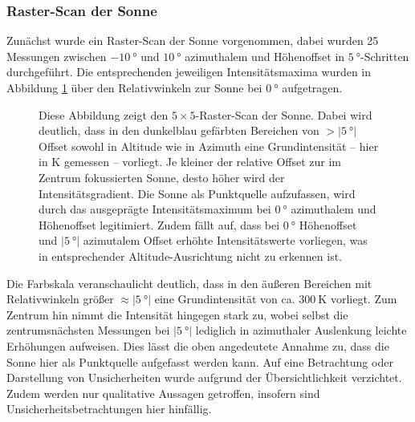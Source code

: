     \subsubsection{Raster-Scan der Sonne}
    Zunächst wurde ein Raster-Scan der Sonne vorgenommen, dabei wurden 25 Messungen zwischen $\SI{-10}{\degree}$ und $\SI{10}{\degree}$ azimuthalem und Höhenoffset in $\SI{5}{\degree}$-Schritten durchgeführt.
    Die entsprechenden jeweiligen Intensitätsmaxima wurden in Abbildung \ref{fig:Sonnenabbild} über den Relativwinkeln zur Sonne bei $\SI{0}{\degree}$ aufgetragen.
    \begin{figure}[H]
        \centering
        
        \caption[Raster-Scan der Sonne]{Diese Abbildung zeigt den $5 \times 5$-Raster-Scan der Sonne. Dabei wird deutlich, dass in den dunkelblau gefärbten Bereichen von $>\vert \SI{5}{\degree}\vert$ Offset sowohl in Altitude wie in Azimuth eine Grundintensität -- hier in \si{\kelvin} gemessen -- vorliegt. Je kleiner der relative Offset zur im Zentrum fokussierten Sonne, desto höher wird der Intensitätsgradient. Die Sonne als Punktquelle aufzufassen, wird durch das ausgeprägte Intensitätsmaximum bei $\SI{0}{\degree}$ azimuthalem und Höhenoffset legitimiert. Zudem fällt auf, dass bei $\SI{0}{\degree}$ Höhenoffset und $\vert\SI{5}{\degree}\vert$ azimutalem Offset erhöhte Intensitätswerte vorliegen, was in entsprechender Altitude-Ausrichtung nicht zu erkennen ist.}
        \label{fig:Sonnenabbild}
    \end{figure}
    Die Farbskala veranschaulicht deutlich, dass in den äußeren Bereichen mit Relativwinkeln größer $\approx \vert \SI{5}{\degree}\vert$ eine Grundintensität von ca. $\SI{300}{\kelvin}$ vorliegt.
    Zum Zentrum hin nimmt die Intensität hingegen stark zu,
    wobei selbst die zentrumsnächsten Messungen bei $\vert\SI{5}{\degree}\vert$ lediglich in azimuthaler Auslenkung leichte Erhöhungen aufweisen.
    Dies lässt die oben angedeutete Annahme zu, dass die Sonne hier als Punktquelle aufgefasst werden kann.
    Auf eine Betrachtung oder Darstellung von Unsicherheiten wurde aufgrund der Übersichtlichkeit verzichtet. Zudem werden nur qualitative Aussagen getroffen, insofern sind Unsicherheitsbetrachtungen hier hinfällig.

